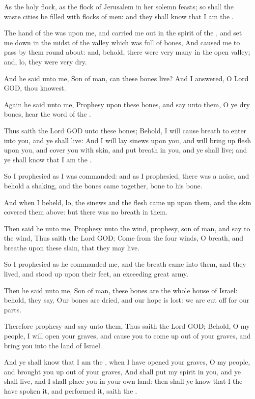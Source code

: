 \Verse As the holy flock, as the flock of Jerusalem in her solemn feasts; so shall the waste cities be filled with flocks of men: and they shall know that I am the \LORD.


\Chapter
\Verse The hand of the \LORD was upon me, and carried me out in the spirit of the \LORD, and set me down in the midst of the valley which was full of bones, \Verse And caused me to pass by them round about: and, behold, there were very many in the open valley; and, lo, they were very dry.

\Verse And he said unto me, Son of man, can these bones live? And I answered, O Lord GOD, thou knowest.

\Verse Again he said unto me, Prophesy upon these bones, and say unto them, O ye dry bones, hear the word of the \LORD.

\Verse Thus saith the Lord GOD unto these bones; Behold, I will cause breath to enter into you, and ye shall live: \Verse And I will lay sinews upon you, and will bring up flesh upon you, and cover you with skin, and put breath in you, and ye shall live; and ye shall know that I am the \LORD.

\Verse So I prophesied as I was commanded: and as I prophesied, there was a noise, and behold a shaking, and the bones came together, bone to his bone.

\Verse And when I beheld, lo, the sinews and the flesh came up upon them, and the skin covered them above: but there was no breath in them.

\Verse Then said he unto me, Prophesy unto the wind, prophesy, son of man, and say to the wind, Thus saith the Lord GOD; Come from the four winds, O breath, and breathe upon these slain, that they may live.

\Verse So I prophesied as he commanded me, and the breath came into them, and they lived, and stood up upon their feet, an exceeding great army.

\Verse Then he said unto me, Son of man, these bones are the whole house of Israel: behold, they say, Our bones are dried, and our hope is lost: we are cut off for our parts.

\Verse Therefore prophesy and say unto them, Thus saith the Lord GOD; Behold, O my people, I will open your graves, and cause you to come up out of your graves, and bring you into the land of Israel.

\Verse And ye shall know that I am the \LORD, when I have opened your graves, O my people, and brought you up out of your graves, \Verse And shall put my spirit in you, and ye shall live, and I shall place you in your own land: then shall ye know that I the \LORD have spoken it, and performed it, saith the \LORD.

